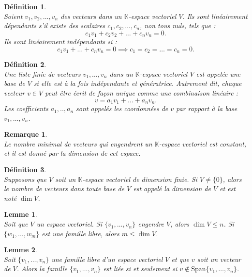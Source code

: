 \documentclass[a4paper, 14pt]{report}
\newtheorem{definition}{Définition}[section]
\newtheorem{remark}{Remarque}[section]
\newtheorem{lemma}{Lemme}
\begin{document}
\begin{onehalfspace}
{\begin{definition} \cite{lang2012algebra} \\
Soient \( v_1, v_2, \dots, v_n \) des vecteurs dans un \(\mathbb{K}\)-espace vectoriel \( V \). Ils sont linéairement dépendants s'il existe des scalaires \( c_1, c_2, \dots, c_n \), non tous nuls, tels que :
	\[
	c_1 v_1 + c_2 v_2 + \dots + c_n v_n = 0.
	\]
	Ils sont linéairement indépendants si :
	\[
	c_1 v_1 + \dots + c_n v_n = 0 \implies c_1 = c_2 = \dots = c_n = 0.
	\]
\end{definition}



\begin{definition} \cite{lang2012algebra} \\
Une liste finie de vecteurs \( v_1, \dots, v_n \) dans un \(\mathbb{K}\)-espace vectoriel \( V \) est appelée une base de \( V \) si elle est à la fois indépendante et génératrice. Autrement dit, chaque vecteur \( v \in V \) peut être écrit de façon unique comme une combinaison linéaire :
	\[
	v = a_1 v_1 + \dots + a_n v_n.
	\]
Les coefficients \(a_1,..,a_n\) sont appelés les coordonnées de \( v \) par rapport à la base \( v_1, \dots, v_n \).
\end{definition}

\begin{remark} \cite{lang2012algebra}\\
Le nombre minimal de vecteurs qui engendrent un \(\mathbb{K}\)-espace vectoriel est constant, et il est donné par la dimension de cet espace.
\end{remark}

\begin{definition} \cite{lang2012algebra} \\
Supposons que \( V \) soit un \(\mathbb{K}\)-espace vectoriel de dimension finie. Si \( V \neq \{0\} \), alors le nombre de vecteurs dans toute base de \( V \) est appelé la dimension de \( V \) et est noté \( \dim V \).
\end{definition}


\begin{lemma} \cite{lang2012algebra} \\
Soit que \( V \) un espace vectoriel. Si \( \{v_1, \dots, v_n\} \) engendre \( V \), alors \( \dim V \leq n \). Si \( \{w_1, \dots, w_m\} \) est une famille libre, alors \( m \leq \dim V \).
\end{lemma}

\begin{lemma} \cite{lang2012algebra} \\
Soit \( \{v_1, \dots, v_n\} \) une famille libre d'un espace vectoriel $V$ et que \( v \) soit un vecteur de $V$. Alors la famille  \( \{ v_1, \dots, v_n\} \) est liée si et seulement si \( v \notin \mathrm{Span}\{v_1, \dots, v_n\} \).
\end{lemma}


}
\end{onehalfspace}
\end{document}
